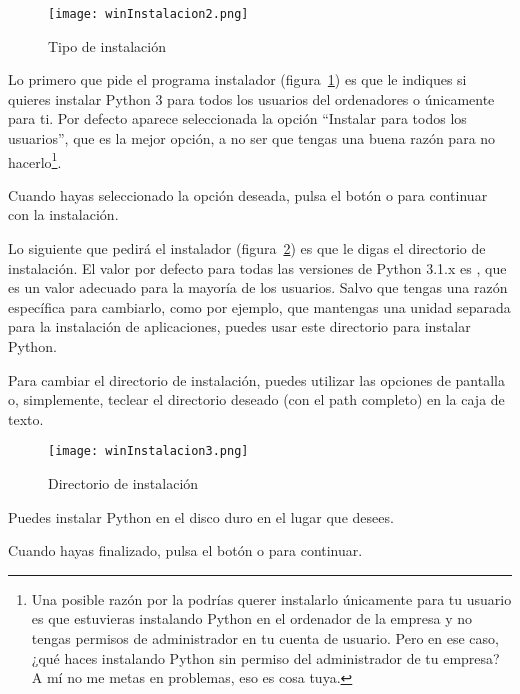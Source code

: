 \begin{figure}[!h]
 \begin{center}
\texttt{[image: winInstalacion2.png]}
\caption{Tipo de instalación}\label{fig02}
  \end{center}
\end{figure}

Lo primero que pide el programa instalador (figura~\ref{fig02}) es que le indiques si quieres instalar Python 3 para todos los usuarios del ordenadores o únicamente para ti. Por defecto aparece seleccionada la opción ``Instalar para todos los usuarios'', que es la mejor opción, a no ser que tengas una buena razón para no hacerlo\footnote{Una posible razón por la podrías querer instalarlo únicamente para tu usuario es que estuvieras instalando Python en el ordenador de la empresa y no tengas permisos de administrador en tu cuenta de usuario. Pero en ese caso, ¿qué haces instalando Python sin permiso del administrador de tu empresa? A mí no me metas en problemas, eso es cosa tuya.}.

Cuando hayas seleccionado la opción deseada, pulsa el botón  o  para continuar con la instalación.

Lo siguiente que pedirá el instalador (figura~\ref{fig03}) es que le digas el directorio de instalación. El valor por defecto para todas las versiones de Python 3.1.x es , que es un valor adecuado para la mayoría de los usuarios. Salvo que tengas una razón específica para cambiarlo, como por ejemplo, que mantengas una unidad separada para la instalación de aplicaciones, puedes usar este directorio para instalar Python.

Para cambiar el directorio de instalación, puedes utilizar las opciones de pantalla o, simplemente, teclear el directorio deseado (con el path completo) en la caja de texto.

\begin{figure}[!h]
  \begin{center}
\texttt{[image: winInstalacion3.png]}
\caption{Directorio de instalación}\label{fig03}
  \end{center}
\end{figure}

Puedes instalar Python en el disco duro en el lugar que desees.

Cuando hayas finalizado, pulsa el botón  o  para continuar.

